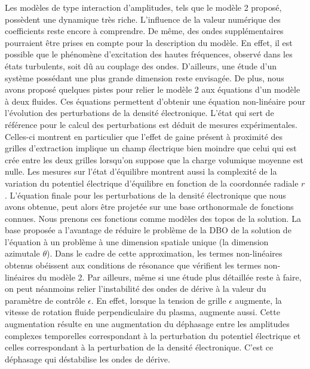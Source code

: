 \documentclass{book}
\begin{document}
Les mod\`eles de type interaction d'amplitudes, tels que le mod\`ele 2
propos\'e, poss\`edent une dynamique tr\`es riche. L'influence de la
valeur num\'erique des coefficients reste encore \`a comprendre. De
m\^eme, des ondes suppl\'ementaires pourraient \^etre
prises en compte pour la description du mod\`ele. En effet, il est
possible que le ph\'enom\`ene d'excitation des hautes fr\'equences,
observ\'e dans les \'etats turbulents, soit d\^u au couplage des
ondes. D'ailleurs, une \'etude d'un syst\`eme poss\'edant une plus grande
dimension reste envisag\'ee.
De plus, nous avons propos\'e quelques pistes pour relier le mod\`ele
2 aux \'equations d'un mod\`ele \`a deux fluides. Ces \'equations
permettent d'obtenir une \'equation non-lin\'eaire pour l'\'evolution des
perturbations de la densit\'e \'electronique. L'\'etat qui sert de
r\'ef\'erence pour le calcul des perturbations est d\'eduit de mesures
exp\'erimentales. Celles-ci montrent en particulier que
l'effet de gaine pr\'esent \`a proximit\'e des grilles d'extraction
implique un champ \'electrique bien moindre que celui qui est cr\'ee
entre les deux grilles lorsqu'on suppose que la charge volumique
moyenne est 
nulle. Les mesures sur l'\'etat d'\'equilibre montrent
aussi la complexit\'e de la variation du potentiel \'electrique
d'\'equilibre en fonction de la coordonn\'ee radiale $r$. L'\'equation
finale pour les perturbations de la 
densit\'e \'electronique que nous avons obtenue, peut alors \^etre
projet\'ee sur 
une base orthonormale de fonctions connues. Nous prenons ces fonctions
comme 
mod\`eles des topos de la solution. La base propos\'ee a l'avantage de
r\'eduire le probl\`eme de la DBO de la solution de l'\'equation \`a
un probl\`eme \`a une dimension spatiale unique (la dimension
azimutale $\theta$). Dans le cadre de cette
approximation, les termes non-lin\'eaires obtenus ob\'eissent aux
conditions de 
r\'esonance que v\'erifient les termes non-lin\'eaires du mod\`ele 2. 
Par ailleurs, m\^eme si une \'etude plus d\'etaill\'ee reste \`a
faire, on peut n\'eanmoins relier l'instabilit\'e des ondes de
d\'erive \`a la valeur du param\`etre de contr\^ole $\epsilon$. En
effet, lorsque la tension de grille $\epsilon$ augmente, la vitesse de
rotation fluide perpendiculaire du plasma, augmente aussi. Cette
augmentation r\'esulte en une augmentation du  d\'ephasage entre
les amplitudes complexes temporelles correspondant \`a la
perturbation du potentiel
\'electrique et celles correspondant \`a la perturbation de la
densit\'e \'electronique. C'est ce d\'ephasage qui d\'estabilise les
ondes de d\'erive.
\end{document}
